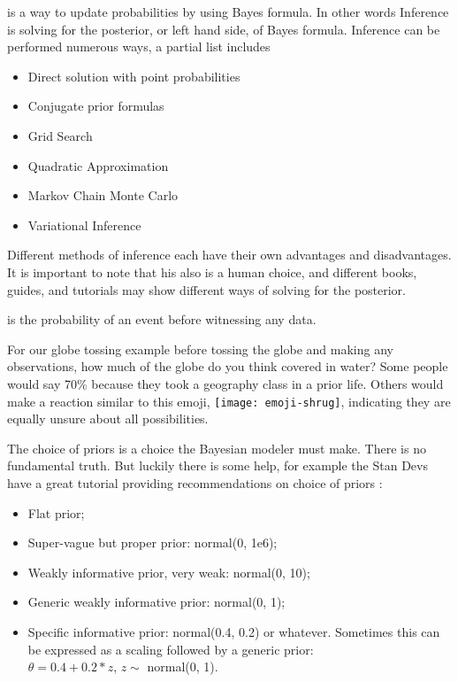  is a way to update probabilities by using Bayes formula. In other words Inference is solving for the posterior, or left hand side, of Bayes formula. Inference can be performed numerous ways, a partial list includes
\begin{itemize}
\item  Direct solution with point probabilities
\item  Conjugate prior formulas
\item  Grid Search
\item  Quadratic Approximation
\item  Markov Chain Monte Carlo
\item  Variational Inference
\end{itemize}
Different methods of inference each have their own advantages and disadvantages. It is important to note that his also is a human choice, and different books, guides, and tutorials may show different ways of solving for the posterior.

 is the probability of an event before witnessing any data.

For our globe tossing example before tossing the globe and making any observations, how much of the globe do you think covered in water? Some people would say 70\% because they took a geography class in a prior life. Others would make a reaction similar to this emoji, \texttt{[image: emoji-shrug]}, indicating they are equally unsure about all possibilities.

The choice of priors is a choice the Bayesian modeler must make. There is no fundamental truth. But luckily there is some help, for example the Stan Devs have a great tutorial providing recommendations on choice of priors \cite{StanwikiPriors2019}:
\begin{itemize}
\item Flat prior;
\item Super-vague but proper prior: normal(0, 1e6);
\item Weakly informative prior, very weak: normal(0, 10);
\item Generic weakly informative prior: normal(0, 1);
\item Specific informative prior: normal(0.4, 0.2) or whatever. Sometimes this can be expressed as a scaling followed by a generic prior: \\$\theta = 0.4 + 0.2*z$, $z\sim$ normal(0, 1).
\end{itemize}


